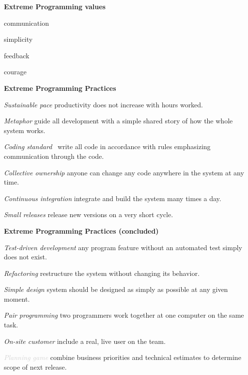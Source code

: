 \documentclass[landscape]{slides}
\renewcommand{\title}[1]{{\large\bfseries #1}}
\newenvironment{itemiz}%
  {\begin{list}{}{\raggedright
      \setlength{\itemsep}{2pt}%
      \setlength{\parskip}{4pt}\setlength{\parsep}{2pt}}}%
  {\end{list}}%
\begin{document}
 \begin{slide}
  \title{Extreme Programming \normalfont\normalsize values}
  \setlength{\topsep}{0pt}\setlength{\parskip}{5pt}
  \begin{itemiz}
   \item communication
   \item simplicity
   \item feedback
   \item courage
  \end{itemiz}
 \end{slide}
 
 \begin{slide}
  \title{Extreme Programming Practices}
  \begin{itemiz}
    \item[\textit{Sustainable pace}]
      {\small productivity does not increase with hours worked.}
    \item[\textit{Metaphor}]
      {\small guide all development with a simple shared story of how
      the whole system works.}
    \item[\textit{Coding standard}]
      {\small\ write all code in accordance with rules emphasizing
      communication through the code.}
    \item[\textit{Collective ownership}]
      {\small anyone can change any code anywhere in the system at any time.}
    \item[\textit{Continuous integration}]
      {\small integrate and build the system many times a day.}
    \item[\textcolor{mediumGray}{\textit{Small releases}}]
      {\small release new versions on a very short cycle.}
   \end{itemiz}
 \end{slide}
  
 \begin{slide}
  \title{Extreme Programming Practices \small(concluded)}
  \begin{itemiz}
    \item[\textcolor{mediumGray}{\textit{Test-driven development}}]
      {\small any program feature without an automated test simply does
	not exist.}
    \item[\textcolor{mediumGray}{\textit{Refactoring}}]
      {\small restructure the system without
	changing its behavior.}
    \item[\textcolor{mediumGray}{\textit{Simple design}}]
      {\small system should be designed as simply as possible at any
	given moment.}
    \item[\textcolor{mediumGray}{\textit{Pair programming}}]
      {\small two programmers work together at one computer on the same
	task.}
    \item[\textcolor{mediumGray}{\textit{On-site customer}}]
      {\small include a real, live user on the team.}  
    \item[\textcolor{lightGray}{\textit{Planning game}}]
      {\small combine business priorities and technical estimates to
	determine scope of next release.}
  \end{itemiz}
 \end{slide}
\end{document}
